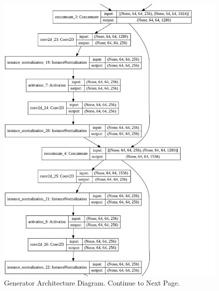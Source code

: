 \begin{figure}[H]
        \vspace*{3cm}
	    \begin{center} 
	    \includegraphics[scale=0.40]{images/generator_4.png}
	    \caption{Generator Architecture Diagram. Continue to Next Page.}
	    \end{center}
\end{figure}


